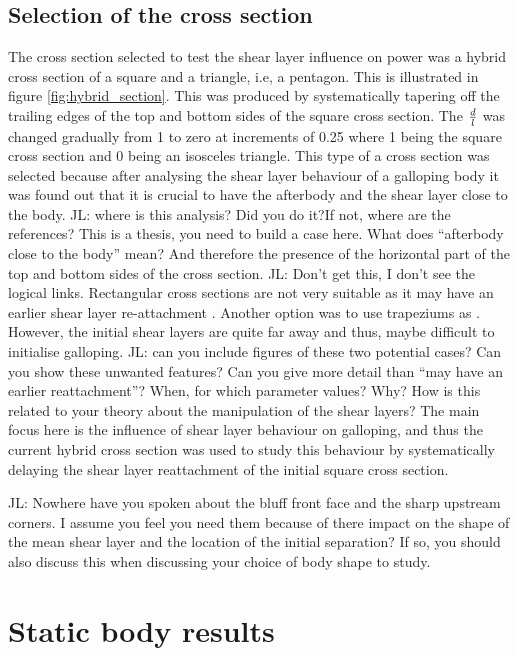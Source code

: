 \subsection*{Selection of the cross section}



The cross section selected to test the shear layer influence on power was a hybrid cross section of a square and a triangle, i.e, a pentagon. This is illustrated in figure \ref{fig:hybrid_section}. This was produced by systematically tapering off the trailing edges of the top and bottom sides of the square cross section. The $\frac{d}{l}$ was changed gradually from 1 to zero at increments of 0.25 where 1 being the square cross section and 0 being an isosceles triangle. This type of a cross section was selected because after analysing the shear layer behaviour of a galloping body it was found out that it is crucial to have the afterbody and the shear layer close to the body. JL: where is this analysis? Did you do it?If not, where are the references? This is a thesis, you need to build a case here. What does ``afterbody close to the body'' mean? And therefore the presence of the horizontal part of the top and bottom sides of the cross section. JL: Don't get this, I don't see the logical links. Rectangular cross sections are not very suitable as it may have an earlier shear layer re-attachment \citet{Paidoussis2010}. Another option was to use trapeziums as \citet{Luo1994}. However, the initial shear layers are quite far away and thus, maybe difficult to initialise galloping. JL: can you include figures of these two potential cases? Can you show these unwanted features? Can you give more detail than ``may have an earlier reattachment''? When, for which parameter values? Why? How is this related to your theory about the manipulation of the shear layers? The main focus here is the influence of shear layer behaviour on galloping, and thus the current hybrid cross section was used to study this behaviour by systematically delaying the shear layer reattachment of the initial square cross section.

JL: Nowhere have you spoken about the bluff front face and the sharp
upstream corners. I assume you feel you need them because of there
impact on the shape of the mean shear layer and the location of the
initial separation? If so, you should also discuss this when
discussing your choice of body shape to study.

\section{Static body results}
\label{sec:cross-sec-Static body results}


